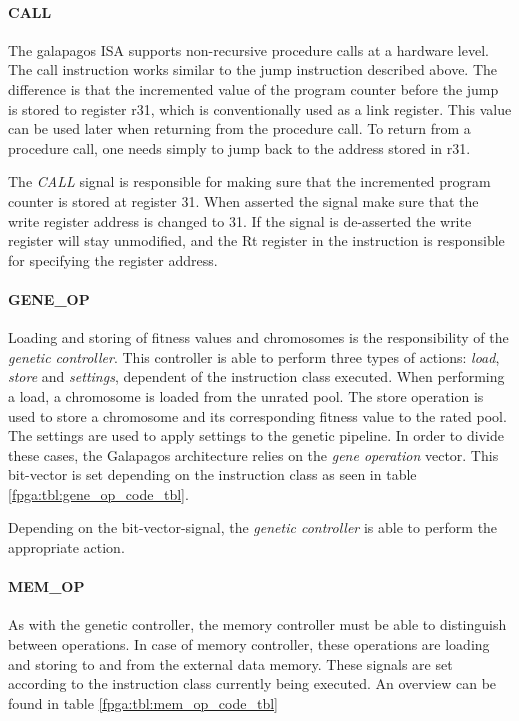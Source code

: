 \paragraph{CALL}
The \Gls{galapagos} ISA supports non-recursive procedure calls at a hardware level.
The call instruction works similar to the jump instruction described above.
The difference is that the incremented value of the program counter before the jump is stored to register r31, which is conventionally used as a link register.
This value can be used later when returning from the procedure call.
To return from a procedure call, one  needs simply to jump back to the address stored in r31.

The \emph{CALL} signal is responsible for making sure that the incremented program counter is stored at register 31.
When asserted the signal make sure that the write register address is changed to 31.
If the signal is de-asserted the write register will stay unmodified, and the Rt register in the instruction is responsible for specifying the register address.


\paragraph{GENE\_OP}
Loading and storing of fitness values and chromosomes is the responsibility of the \emph{genetic controller}.
This controller is able to perform three types of actions: \emph{load}, \emph{store} and \emph{settings}, dependent of the instruction class executed.
When performing a load, a chromosome is loaded from the unrated pool.
The store operation is used to store a chromosome and its corresponding fitness value to the rated pool.
The settings are used to apply settings to the genetic pipeline.
In order to divide these cases, the Galapagos architecture relies on the \emph{gene operation} vector.
This bit-vector is set depending on the instruction class as seen in table \ref{fpga:tbl:gene_op_code_tbl}.



Depending on the bit-vector-signal, the \emph{genetic controller} is able to perform the appropriate action. 

\paragraph{MEM\_OP}
As with the genetic controller, the memory controller must be able to distinguish between operations.
In case of memory controller, these operations are loading and storing to and from the external data memory.
These signals are set according to the instruction class currently being executed.
An overview can be found in table \ref{fpga:tbl:mem_op_code_tbl}

